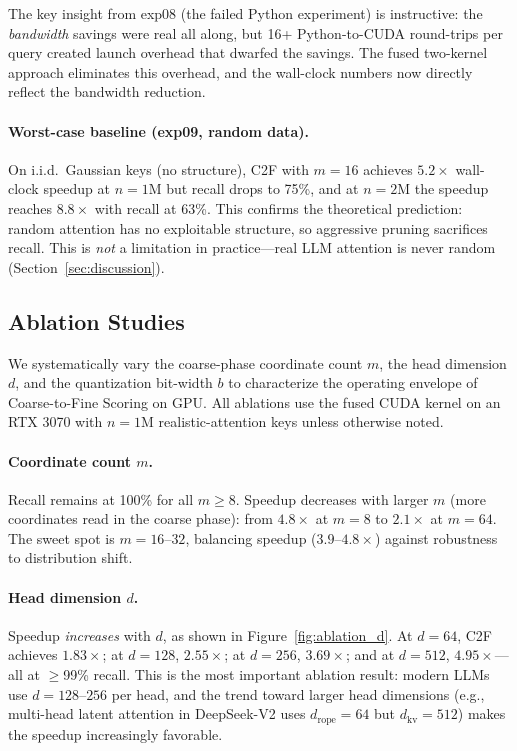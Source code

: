 \documentclass[10pt,twocolumn]{article}
\theoremstyle{definition}
\begin{document}
The key insight from exp08 (the failed Python experiment) is instructive:
the \emph{bandwidth} savings were real all along, but 16+ Python-to-CUDA
round-trips per query created launch overhead that dwarfed the savings.  The
fused two-kernel approach eliminates this overhead, and the wall-clock numbers
now directly reflect the bandwidth reduction.

\paragraph{Worst-case baseline (exp09, random data).}
On i.i.d.\ Gaussian keys (no structure), C2F with $m = 16$ achieves $5.2\times$
wall-clock speedup at $n = 1$M but recall drops to 75\%, and at $n = 2$M the
speedup reaches $8.8\times$ with recall at 63\%.  This confirms the theoretical
prediction: random attention has no exploitable structure, so aggressive pruning
sacrifices recall.  This is \emph{not} a limitation in practice---real LLM
attention is never random (Section~\ref{sec:discussion}).


\subsection{Ablation Studies}
\label{sec:ablations}

We systematically vary the coarse-phase coordinate count $m$, the head dimension
$d$, and the quantization bit-width $b$ to characterize the operating envelope
of Coarse-to-Fine Scoring on GPU.  All ablations use the fused CUDA kernel on an
RTX 3070 with $n = 1$M realistic-attention keys unless otherwise noted.

\paragraph{Coordinate count $m$.}
Recall remains at 100\% for all $m \geq 8$.  Speedup decreases with larger $m$
(more coordinates read in the coarse phase): from $4.8\times$ at $m = 8$ to
$2.1\times$ at $m = 64$.  The sweet spot is $m = 16$--$32$, balancing speedup
($3.9$--$4.8\times$) against robustness to distribution shift.

\paragraph{Head dimension $d$.}
Speedup \emph{increases} with $d$, as shown in Figure~\ref{fig:ablation_d}.
At $d = 64$, C2F achieves $1.83\times$; at $d = 128$, $2.55\times$; at
$d = 256$, $3.69\times$; and at $d = 512$, $4.95\times$---all at $\geq$99\% recall.
This is the most important ablation result: modern LLMs use $d = 128$--$256$
per head, and the trend toward larger head dimensions (e.g., multi-head latent
attention in DeepSeek-V2 uses $d_{\text{rope}} = 64$ but $d_{\text{kv}} = 512$)
makes the speedup increasingly favorable.
\end{document}
